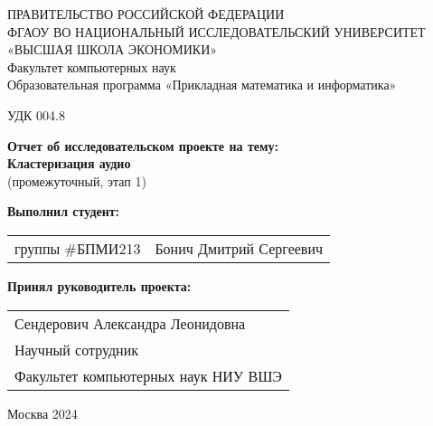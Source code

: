\begin{titlepage}
\newpage

{
\begin{center}
ПРАВИТЕЛЬСТВО РОССИЙСКОЙ ФЕДЕРАЦИИ\\
ФГАОУ ВО НАЦИОНАЛЬНЫЙ ИССЛЕДОВАТЕЛЬСКИЙ УНИВЕРСИТЕТ\\
«ВЫСШАЯ ШКОЛА ЭКОНОМИКИ»
\\
\bigskip
Факультет компьютерных наук\\
Образовательная программа «Прикладная математика и информатика»
\end{center}
}

\vspace{2em}
УДК 004.8 %
\vspace{5em}

\begin{center}
{\bf Отчет об исследовательском проекте на тему:}\\
{\bf Кластеризация аудио}\\
(промежуточный, этап 1)
\end{center}

\vspace{2em}

{\bf Выполнил студент: \vspace{2mm}}

{
\begin{tabular}{l@{\hskip 1.5cm}l}
группы \#БПМИ213 & Бонич Дмитрий Сергеевич 
\end{tabular}}

\vspace{1em}
{\bf Принял руководитель проекта: \vspace{2mm}}

{
\begin{tabular}{l}
Сендерович Александра Леонидовна\\
Научный сотрудник\\
Факультет компьютерных наук НИУ ВШЭ 
\end{tabular}}

\vspace{\fill}

\begin{center}
Москва 2024
\end{center}

\end{titlepage}
